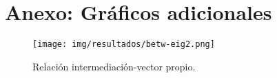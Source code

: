 \section{Anexo: Gráficos adicionales}

\begin{figure}[ht]
    \centerfloat
    \texttt{[image: img/resultados/betw-eig2.png]}
    \caption{Relación intermediación-vector propio.}
\end{figure}